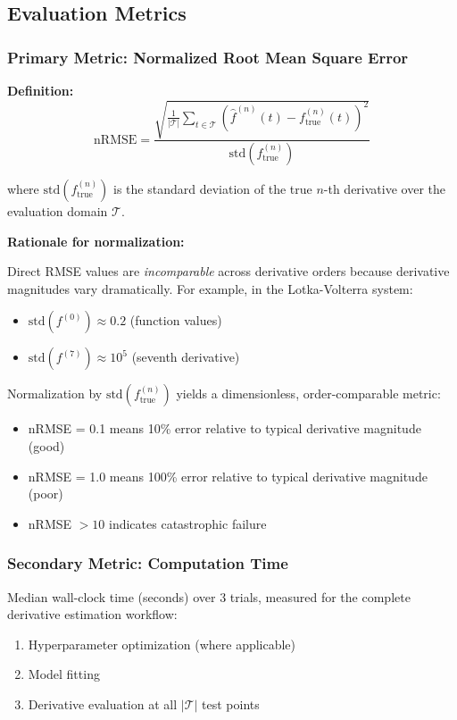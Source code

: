 \subsection{Evaluation Metrics}
\label{sec:metrics}

\subsubsection{Primary Metric: Normalized Root Mean Square Error}

\textbf{Definition:}
\begin{equation}
\text{nRMSE} = \frac{\sqrt{\frac{1}{|\mathcal{T}|} \sum_{t \in \mathcal{T}} \left(\hat{f}^{(n)}(t) - f^{(n)}_{\text{true}}(t)\right)^2}}{\text{std}(f^{(n)}_{\text{true}})}
\end{equation}

where $\text{std}(f^{(n)}_{\text{true}})$ is the standard deviation of the true $n$-th derivative over the evaluation domain $\mathcal{T}$.

\textbf{Rationale for normalization:}

Direct RMSE values are \textit{incomparable} across derivative orders because derivative magnitudes vary dramatically. For example, in the Lotka-Volterra system:
\begin{itemize}
    \item $\text{std}(f^{(0)}) \approx 0.2$ (function values)
    \item $\text{std}(f^{(7)}) \approx 10^5$ (seventh derivative)
\end{itemize}

Normalization by $\text{std}(f^{(n)}_{\text{true}})$ yields a dimensionless, order-comparable metric:
\begin{itemize}
    \item nRMSE = 0.1 means 10\% error relative to typical derivative magnitude (good)
    \item nRMSE = 1.0 means 100\% error relative to typical derivative magnitude (poor)
    \item nRMSE $> 10$ indicates catastrophic failure
\end{itemize}

\subsubsection{Secondary Metric: Computation Time}

Median wall-clock time (seconds) over 3 trials, measured for the complete derivative estimation workflow:
\begin{enumerate}
    \item Hyperparameter optimization (where applicable)
    \item Model fitting
    \item Derivative evaluation at all $|\mathcal{T}|$ test points
\end{enumerate}

